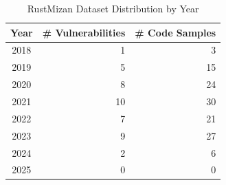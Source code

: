 \begin{table}[htbp]
\centering
\footnotesize
\caption{RustMizan Dataset Distribution by Year}
\label{tab:yearly_distribution}
\begin{tabular}{@{}crr@{}}
\toprule
\textbf{Year} & \textbf{\# Vulnerabilities} & \textbf{\# Code Samples} \\
\midrule
2018 & 1 & 3 \\
2019 & 5 & 15 \\
2020 & 8 & 24 \\
2021 & 10 & 30 \\
2022 & 7 & 21 \\
2023 & 9 & 27 \\
2024 & 2 & 6 \\
2025 & 0 & 0 \\
\bottomrule
\end{tabular}
\end{table}